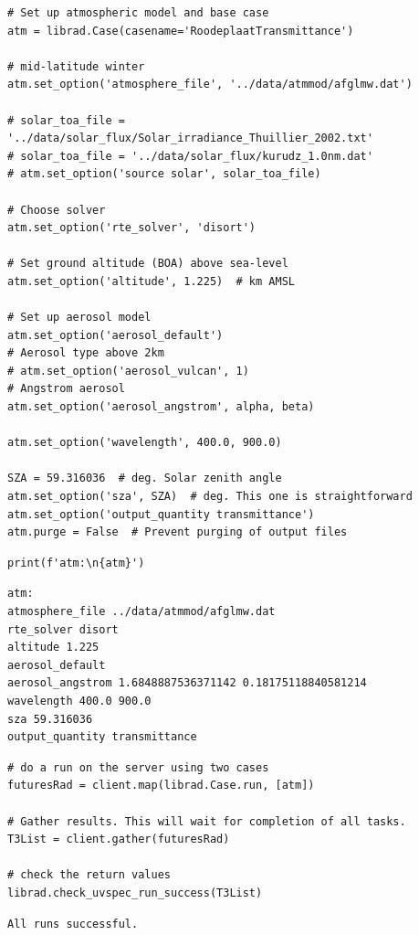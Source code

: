 \begin{lstlisting}[style=tinysize]
# Set up atmospheric model and base case
atm = librad.Case(casename='RoodeplaatTransmittance')

# mid-latitude winter
atm.set_option('atmosphere_file', '../data/atmmod/afglmw.dat')  

# solar_toa_file = '../data/solar_flux/Solar_irradiance_Thuillier_2002.txt'
# solar_toa_file = '../data/solar_flux/kurudz_1.0nm.dat'
# atm.set_option('source solar', solar_toa_file)

# Choose solver
atm.set_option('rte_solver', 'disort')

# Set ground altitude (BOA) above sea-level
atm.set_option('altitude', 1.225)  # km AMSL

# Set up aerosol model
atm.set_option('aerosol_default')
# Aerosol type above 2km
# atm.set_option('aerosol_vulcan', 1)  
# Angstrom aerosol
atm.set_option('aerosol_angstrom', alpha, beta)

atm.set_option('wavelength', 400.0, 900.0)

SZA = 59.316036  # deg. Solar zenith angle
atm.set_option('sza', SZA)  # deg. This one is straightforward
atm.set_option('output_quantity transmittance')
atm.purge = False  # Prevent purging of output files

\end{lstlisting}


\begin{lstlisting}[style=tinysize]
print(f'atm:\n{atm}')
\end{lstlisting}


\begin{lstlisting}[style=outcellstyle]
atm:
atmosphere_file ../data/atmmod/afglmw.dat
rte_solver disort
altitude 1.225
aerosol_default 
aerosol_angstrom 1.6848887536371142 0.18175118840581214
wavelength 400.0 900.0
sza 59.316036
output_quantity transmittance

\end{lstlisting}


\begin{lstlisting}[style=tinysize]
# do a run on the server using two cases
futuresRad = client.map(librad.Case.run, [atm])

# Gather results. This will wait for completion of all tasks.
T3List = client.gather(futuresRad)    

# check the return values
librad.check_uvspec_run_success(T3List)
\end{lstlisting}


\begin{lstlisting}[style=outcellstyle]
All runs successful.

\end{lstlisting}


